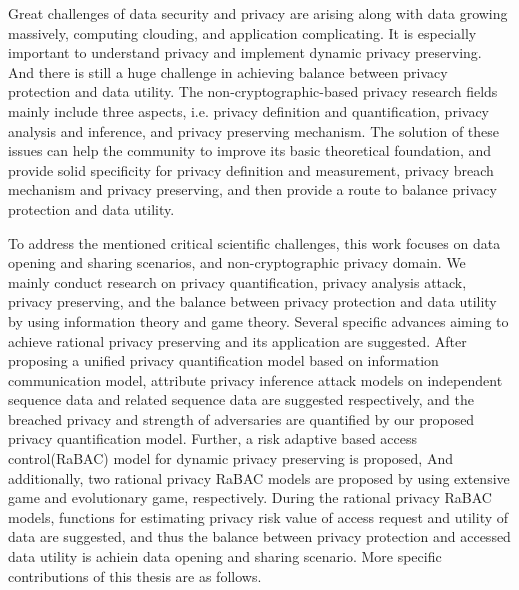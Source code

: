 \documentclass[pdftex,notypeinfo,twoside,openany,UTF8,fntef]{CASthesis}
\theoremstyle{THrm}{
	\newtheorem{question}{Question}[section]
	\newtheorem{property}{性质}[section]
	\newtheorem{assumption}{假设}[section]
	\newtheorem{claim}[lemma]{断言}
	
}
\begin{document}
Great challenges of data security and privacy are arising along with data growing massively, computing clouding, and application complicating. It is especially important to understand privacy and implement dynamic privacy preserving. And there is still a huge challenge in achieving balance between privacy protection and data utility. The non-cryptographic-based privacy research fields mainly include three aspects, i.e. privacy definition and quantification, privacy analysis and inference, and privacy preserving mechanism. The solution of these issues can help the community to improve its basic theoretical foundation, and provide solid specificity for privacy definition and measurement, privacy breach mechanism and privacy preserving, and then provide a
route to balance privacy protection and data utility. 

To address the mentioned critical scientific challenges, this work focuses on data opening and sharing scenarios, and non-cryptographic privacy domain. We mainly conduct research on privacy quantification, privacy analysis attack, privacy preserving, and the balance between privacy protection and data utility by using information theory and game theory. Several specific advances aiming to achieve rational privacy preserving and its application are suggested. After proposing a unified privacy quantification model based on information communication model,  attribute privacy inference attack models on independent sequence data and related sequence data are suggested respectively, and the breached privacy and strength of adversaries are quantified by our proposed  privacy quantification model. Further, a risk adaptive based access control(RaBAC) model for dynamic privacy preserving  is proposed, And additionally, two rational privacy RaBAC models are proposed by using extensive game and evolutionary game, respectively. During the rational privacy RaBAC models, functions for estimating privacy risk value of access request and utility of data are suggested, and thus the balance between privacy protection and accessed data utility is achiein data opening and sharing scenario. More specific contributions of this thesis are as follows.
\end{document}
